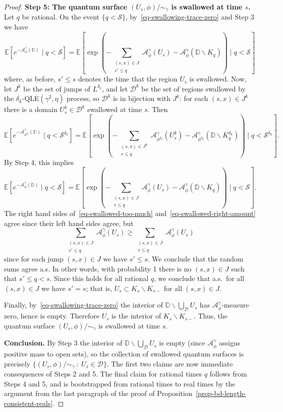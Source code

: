 \documentclass[a4paper]{article}
\numberwithin{equation}{section}
\newcommand{\eqb}{\begin{equation}}
\newcommand{\eqe}{\end{equation}}
\newcommand{\D}{\mathbb{D}}
\newcommand{\E}{\mathbb{E}}
\newcommand{\cA}{\mathcal{A}}
\newcommand{\cD}{\mathcal{D}}
\newcommand{\qduration}{\mathcal{S}}
\theoremstyle{remark}
\numberwithin{equation}{section}
\begin{document}
\begin{proof}
\medskip \noindent \textbf{Step 5: The quantum surface $(U_s, \phi)/{\sim_\gamma}$ is swallowed at time $s$.} 
Let $q$ be rational. On the event $\{ q < \qduration\}$, by~\eqref{eq-swallowing-trace-zero} and Step 3 we have 
\eqb\label{eq-swallowed-too-much}
\E[e^{-\cA^\gamma_{\phi}(\D)} \mid q < \qduration] = \E[ \exp( - \sum_{\substack{(s, x) \in J \\ s' \leq q }} \cA^\gamma_\phi(U_s) - \cA^\gamma_\phi(\D \backslash K_q) ) \mid q < \qduration]
\eqe
where, as before, $s'\leq s$ denotes the time that the region $U_s$ is swallowed. 
Now, let $J^k$ be the set of jumps of $L^{\delta_k}$, and let $\cD^k$ be the set of regions swallowed by the $\delta_k$-QLE$(\gamma^2, \eta)$ process, so $\cD^k$ is in bijection with $J^k$: for each $(s, x) \in J^k$ there is a domain $U_s^k \in \cD^k$ swallowed at time $s$. Then 
\[\E[e^{-\cA^\gamma_{\phi^{\delta_k}}(\D)} \mid q < \qduration^{\delta_k}] = \E[ \exp( - \sum_{\substack{(s, x) \in J^k \\ s \leq q }} \cA^\gamma_{\phi^{\delta_k}}(U_s^k) - \cA^\gamma_{\phi^{\delta_k}}(\D \backslash K^{\delta_k}_q) ) \mid q < \qduration^{\delta_k}].\]
By Step 4, this implies 
\eqb\label{eq-swallowed-right-amount}
\E[e^{-\cA^\gamma_{\phi}(\D)} \mid q < \qduration] = \E[ \exp( - \sum_{\substack{(s, x) \in J \\ s \leq q }} \cA^\gamma_\phi(U_s) - \cA^\gamma_\phi(\D \backslash K_q) ) \mid q < \qduration].
\eqe
The right hand sides of~\eqref{eq-swallowed-too-much} and~\eqref{eq-swallowed-right-amount} agree since their left hand sides agree, but 
\[\sum_{\substack{(s, x) \in J \\ s' \leq q }} \cA^\gamma_\phi(U_s) \geq \sum_{\substack{(s, x) \in J \\ s \leq q }} \cA^\gamma_\phi(U_s)\] since for each jump $(s,x) \in J$ we have $s' \leq s$. We conclude that the random sums agree a.s. In other words, with probability 1 there is no $(s,x) \in J$ such that  $s' \leq q < s$. Since this holds for all rational $q$, we conclude that a.s.\ for all $(s,x) \in J$ we have $s' = s$; that is, $U_s \subset K_s \backslash K_{s-}$ for all $(s,x) \in J$. 

Finally, by~\eqref{eq-swallowing-trace-zero} the interior of $\D \backslash \bigcup_\cD U_s$ has $\cA^\gamma_\phi$-measure zero, hence is empty. Therefore $U_s$ is the interior of $K_s \backslash K_{s-}$. Thus, the quantum surface $(U_s, \phi)/{\sim_\gamma}$ is swallowed at time $s$. 


\medskip \noindent \textbf{Conclusion.} 
By Step 3 the interior of $\D \backslash \bigcup_\cD U_s$ is empty (since $\cA^\gamma_\phi$ assigns positive mass to open sets), so the collection of swallowed quantum surfaces is precisely $\{(U_s, \phi)/{\sim_\gamma} \: : \: U_s \in \cD\}$. The first two claims are now immediate consequences of Steps 2 and 5. The final claim for rational times $q$ follows from Steps 4 and 5, and is bootstrapped from rational times to real times by the  argument from the last paragraph of the proof of Proposition~\ref{prop-bd-length-consistent-reals}. 
\end{proof}
\end{document}
